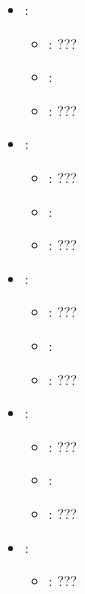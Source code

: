 \begin{itemize}
\begin{itemize}
                \item \optionPossibleValues{}: ???
                \item \optionDefaultValue{}: 
                \item \optionDescrption{}: ???
           \end{itemize}
    \item {}:
           \begin{itemize}
                \item \optionPossibleValues{}: ???
                \item \optionDefaultValue{}: 
                \item \optionDescrption{}: ???
           \end{itemize}
    \item {}:
           \begin{itemize}
                \item \optionPossibleValues{}: ???
                \item \optionDefaultValue{}: 
                \item \optionDescrption{}: ???
           \end{itemize}
    \item {}:
           \begin{itemize}
                \item \optionPossibleValues{}: ???
                \item \optionDefaultValue{}: 
                \item \optionDescrption{}: ???
           \end{itemize}
    \item {}:
           \begin{itemize}
                \item \optionPossibleValues{}: ???
                \item \optionDefaultValue{}: 
                \item \optionDescrption{}: ???
           \end{itemize}
    \item {}:
           \begin{itemize}
                \item \optionPossibleValues{}: ???

\end{itemize}
\end{itemize}
